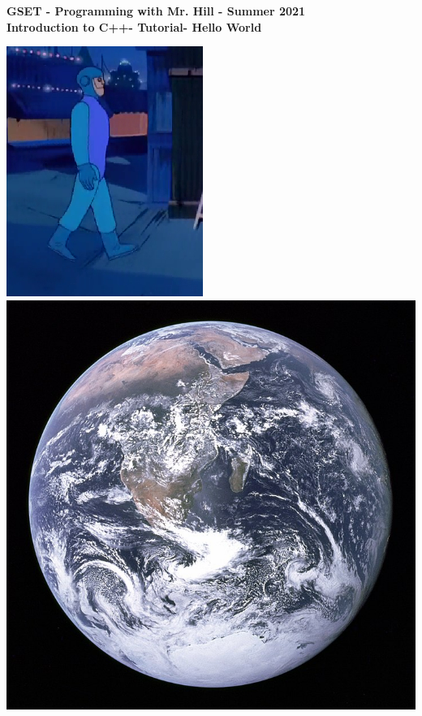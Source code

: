 \documentclass[12pt]{article}
\newcommand{\MNUM}{0} %
\newcommand{\MNAME}{Introduction to C++} %
\newcommand{\TNAME}{Hello World} %
\begin{document}
\thispagestyle{plain}

\begin{center}
   {\bf \large GSET - Programming with Mr. Hill - Summer 2021} \vspace{5mm}\\
   {\bf \Large \MNAME \hspc -  Tutorial\hspc\MNUM\hspc - \TNAME}\vspace{3mm}\\
   
\end{center}

 \hspace*{3cm}\includegraphics[scale=.6]{charlie_robot_sideview.png} \hspace*{1cm}\includegraphics[scale=.18]{blue_marble.jpg}
\end{document}
